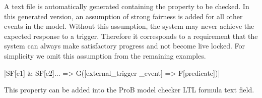 A text file is automatically generated containing the \LTL property to be checked. 
In this generated version, an assumption of strong fairness is added for all other events in the model.
Without this assumption, the system may never achieve the expected response to a trigger. 
Therefore it corresponds to a requirement that the system can always make satisfactory progress and not become live locked.
For simplicity we omit this assumption from the remaining examples.
\begin{center}
  |SF[e1] & SF[e2]... => G([external_trigger _event] => F[predicate])|
\end{center}
This property can be added into the ProB model checker LTL formula text field.



